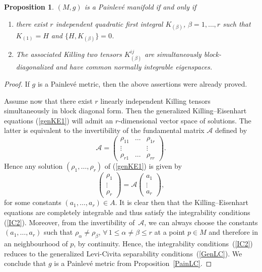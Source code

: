 \documentclass[pdftex]{sigma}
\numberwithin{equation}{section}
\newtheorem{Proposition}[Theorem]{Proposition}
 { \theoremstyle{definition}
\newtheorem{Definition}[Theorem]{Definition}
\newtheorem{Example}[Theorem]{Example}
\newtheorem{Remark}[Theorem]{Remark} }
\begin{document}
\begin{Proposition} \label{PainKA}
$(M,g)$ is a Painlev\'e manifold if and only if
\begin{enumerate}\itemsep=0pt
\item[$1)$] there exist $r$ independent quadratic first integral $K_{(\beta)}$, $\beta = 1,\dots,r$ such that $K_{(1)} = H$ and $\{ H, K_{(\beta)} \} = 0$.
\item[$2)$] The associated Killing two tensors	$K_{(\beta)}^{ij}$ are simultaneously block-diagonalized and have common normally integrable eigenspaces.
\end{enumerate}
\end{Proposition}
\begin{proof}
If $g$ is a Painlev\'e metric, then the above assertions were already proved.

Assume now that there exist $r$ linearly independent Killing tensors simultaneously in block diagonal form. Then the generalized Killing--Eisenhart equations (\ref{genKE1}) will admit an $r$-dimen\-sio\-nal vector space of solutions. The latter is equivalent to the invertibility of the fundamental matrix $\mathcal{A}$ defined by
\[
{\mathcal{A}}=\left(
\begin{matrix}
\rho_{11}&\dots&\rho_{1r} \\
\vdots& & \vdots \\
\rho_{r1}&\dots&\rho_{rr}
\end{matrix}
\right).
\]
Hence any solution $(\rho_{1},\dots,\rho_{r})$ of (\ref{genKE1}) is given by
\[
\left(
\begin{matrix}\rho_{1}\\
\vdots\\
\rho_{r}
\end{matrix}
\right)
=
{\mathcal{A}}\left(
\begin{matrix}a_{1}\\
\vdots\\
a_{r}
\end{matrix}
\right),
\]
for some constants $(a_{1},\dots,a_{r})\in A$. It is clear then that the Killing--Eisenhart equations are completely integrable and thus satisfy the integrability conditions (\ref{IC2}). Moreover, from the invertibility of~$\mathcal{A}$, we can always choose the constants $(a_1,\dots,a_r)$ such that $\rho_{\alpha} \neq \rho_{\beta}$, $\forall\, 1 \leq \alpha \ne \beta \leq r$ at a point $p\in M$ and therefore in an neighbourhood of $p$, by continuity. Hence, the integrabi\-li\-ty conditions~(\ref{IC2}) reduces to the generalized Levi-Civita separability conditions~(\ref{GenLC}). We conclude that $g$ is a Painlev\'e metric from Proposition~\ref{PainLC}.
\end{proof}
\end{document}
